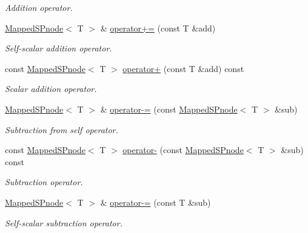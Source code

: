 \begin{DoxyCompactItemize}
\begin{DoxyCompactList}\small\item\em \-Addition operator. \end{DoxyCompactList}\item 
\hyperlink{classsubpavings_1_1MappedSPnode}{\-Mapped\-S\-Pnode}$<$ \-T $>$ \& \hyperlink{classsubpavings_1_1MappedSPnode_a11f57501aac4b67b779e3344290101b4}{operator+=} (const \-T \&add)
\begin{DoxyCompactList}\small\item\em \-Self-\/scalar addition operator. \end{DoxyCompactList}\item 
const \hyperlink{classsubpavings_1_1MappedSPnode}{\-Mapped\-S\-Pnode}$<$ \-T $>$ \hyperlink{classsubpavings_1_1MappedSPnode_a9c951e4722b21949175ab3997dcd3a86}{operator+} (const \-T \&add) const 
\begin{DoxyCompactList}\small\item\em \-Scalar addition operator. \end{DoxyCompactList}\item 
\hyperlink{classsubpavings_1_1MappedSPnode}{\-Mapped\-S\-Pnode}$<$ \-T $>$ \& \hyperlink{classsubpavings_1_1MappedSPnode_a1ca00409cd79226e2b626acfb20ea054}{operator-\/=} (const \hyperlink{classsubpavings_1_1MappedSPnode}{\-Mapped\-S\-Pnode}$<$ \-T $>$ \&sub)
\begin{DoxyCompactList}\small\item\em \-Subtraction from self operator. \end{DoxyCompactList}\item 
const \hyperlink{classsubpavings_1_1MappedSPnode}{\-Mapped\-S\-Pnode}$<$ \-T $>$ \hyperlink{classsubpavings_1_1MappedSPnode_acf2b59252b57c2201c5184dbb02a5a20}{operator-\/} (const \hyperlink{classsubpavings_1_1MappedSPnode}{\-Mapped\-S\-Pnode}$<$ \-T $>$ \&sub) const 
\begin{DoxyCompactList}\small\item\em \-Subtraction operator. \end{DoxyCompactList}\item 
\hyperlink{classsubpavings_1_1MappedSPnode}{\-Mapped\-S\-Pnode}$<$ \-T $>$ \& \hyperlink{classsubpavings_1_1MappedSPnode_a6c67949c1c356830bd0edaae9f75ccbe}{operator-\/=} (const \-T \&sub)
\begin{DoxyCompactList}\small\item\em \-Self-\/scalar subtraction operator. \end{DoxyCompactList}\item 

\end{DoxyCompactItemize}
